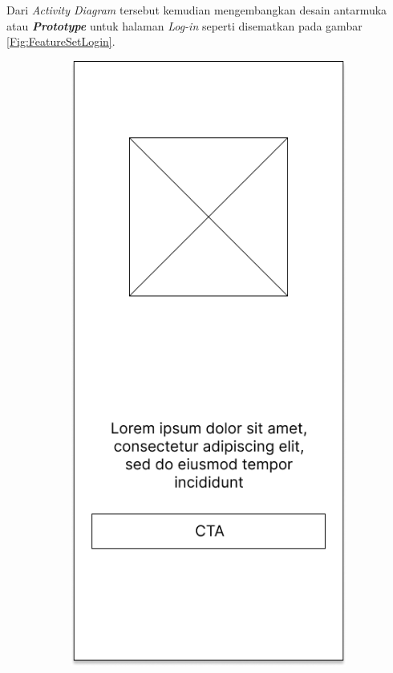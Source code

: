 Dari \textit{Activity Diagram} tersebut kemudian mengembangkan desain antarmuka atau \textbf{\textit{Prototype}} untuk halaman \textit{Log-in} seperti disematkan pada gambar \ref*{Fig:FeatureSetLogin}.
\begin{figure}[H]
	\centering
	\begin{subfigure}[b]{0.3\textwidth}
		\centering
	  \includegraphics[width=\linewidth]{contents/chapter-3/images/MF-login.png}

\end{subfigure}
\end{figure}
